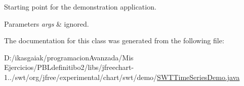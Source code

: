 Starting point for the demonstration application.


\begin{DoxyParams}{Parameters}
{\em args} & ignored. \\
\hline
\end{DoxyParams}


The documentation for this class was generated from the following file\+:\begin{DoxyCompactItemize}
\item 
D\+:/ikasgaiak/programacion\+Avanzada/\+Mis Ejercicios/\+P\+B\+Ldefinitibo2/libs/jfreechart-\/1../swt/org/jfree/experimental/chart/swt/demo/\mbox{\hyperlink{_s_w_t_time_series_demo_8java}{S\+W\+T\+Time\+Series\+Demo.\+java}}\end{DoxyCompactItemize}
